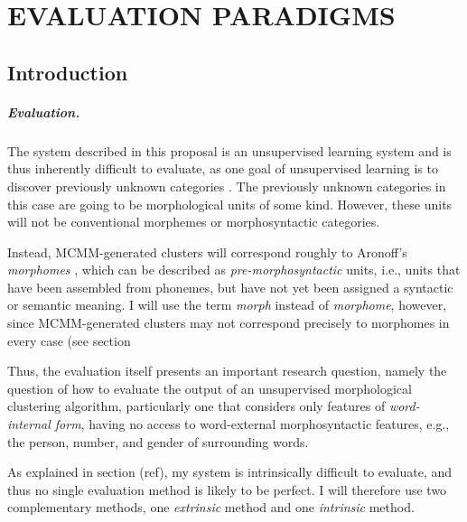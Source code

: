 \chapter{EVALUATION PARADIGMS}

\section{Introduction}

\paragraph{Evaluation.} The system described in this proposal is an unsupervised learning system and is thus inherently difficult to evaluate, as one goal of unsupervised learning is to discover previously unknown categories \citep{parsons:2004}.
The previously unknown categories in this case are going to be morphological units of some kind.
However, these units will not be conventional morphemes or morphosyntactic categories. 

Instead, MCMM-generated clusters will correspond roughly to Aronoff's 
\emph{morphomes} \citep{aronoff:1994}, which can be described as \emph{pre-morphosyntactic} units, i.e.,
units that have been assembled from phonemes, but have not yet been assigned 
a syntactic or semantic meaning. I will use the term \emph{morph} instead of 
\emph{morphome}, however, since MCMM-generated clusters may not correspond 
precisely to morphomes in every case (see section %

Thus, the evaluation itself presents an important research question, namely the question of how to evaluate the output of an unsupervised morphological clustering algorithm, particularly one that considers only features of \emph{word-internal form}, having no access to word-external morphosyntactic features, e.g., the person, number, and gender of  surrounding words.

As explained in section (ref), my system is intrinsically difficult to evaluate, and thus no single evaluation method is likely to be perfect. I will therefore use two complementary methods, %
one \emph{extrinsic} method and one \emph{intrinsic} method.

